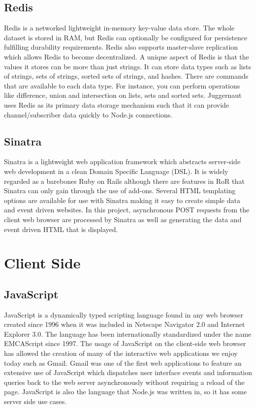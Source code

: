\documentclass[12pt]{report}	%
\theoremstyle{definition}
\theoremstyle{remark}
\begin{document}
\subsection{Redis}

Redis is a networked lightweight in-memory key-value data store. The
whole dataset is stored in RAM, but Redis can optionally be configured
for persistence fulfilling durability requirements. Redis also supports
master-slave replication which allows Redis to become decentralized. A
unique aspect of Redis is that the values it stores can be more than
just strings. It can store data types such as lists of strings, sets of
strings, sorted sets of strings, and hashes. There are commands that are
available to each data type. For instance, you can perform operations
like difference, union and intersection on lists, sets and sorted sets.
Juggernaut uses Redis as its primary data storage mechanism such that it
can provide channel/subscriber data quickly to Node.js connections.

\subsection{Sinatra}

Sinatra is a lightweight web application framework which abstracts
server-side web development in a clean Domain Specific Language (DSL).
It is widely regarded as a barebones Ruby on Rails although there are
features in RoR that Sinatra can only gain through the use of add-ons.
Several HTML templating options are available for use with Sinatra
making it easy to create simple data and event driven websites. In this
project, asynchronous POST requests from the client web browser are
processed by Sinatra as well as generating the data and event driven
HTML that is displayed.

\section{Client Side}

\subsection{JavaScript}

JavaScript is a dynamically typed scripting language found in any web
browser created since 1996 when it was included in Netscape Navigator
2.0 and Internet Explorer 3.0. The language has been internationally
standardized under the name EMCAScript since 1997. The usage of
JavaScript on the client-side web browser has allowed the creation of
many of the interactive web applications we enjoy today such as Gmail.
Gmail was one of the first web applications to feature an extensive use
of JavaScript which dispatches user interface events and information
queries back to the web server asynchronously without requiring a reload
of the page. JavaScript is also the language that Node.js was written
in, so it has some server side use cases.
\end{document}
